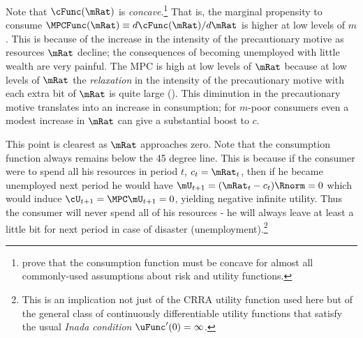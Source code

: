 \documentclass{\handout}
\begin{document}
Note that $\cFunc(\mRat)$ is {\it concave}.\footnote{\cite{carroll&kimball:concavity} prove that the consumption
function must be concave for almost all commonly-used assumptions about
risk and utility functions.} That is, the marginal propensity to
consume $\MPCFunc(\mRat) \equiv d \cFunc(\mRat)/d \mRat$ is higher at low levels of $m$.  This is because
of the increase in the intensity of the precautionary motive as resources
$\mRat$ decline; the consequences of becoming unemployed with little wealth are very painful.  The MPC is high at low
levels of $\mRat$ because at low levels of $\mRat$ the {\it relaxation} in the
intensity of the precautionary motive with each extra bit of $\mRat$ is quite large (\cite{kimball:smallandlarge}).
This diminution in the precautionary motive translates into an increase
in consumption; for $m$-poor consumers even a modest increase in $\mRat$ can
give a substantial boost to $c$.

This point is clearest as $\mRat$ approaches zero.  Note that the
consumption function always remains below the 45 degree line.  This
is because if the consumer were to spend all his resources in
period $t$, $c_{t}=\mRat_{t}$, then if he became unemployed next
period he would have $\mU_{t+1}=(\mRat_{t}-c_{t})\Rnorm=0$ which
would induce $\cU_{t+1}= \MPCU \mU_{t+1}=0$, yielding negative
infinite utility.  Thus the consumer will never spend all of his
resources - he will always leave at least a little bit for next period
in case of disaster (unemployment).\footnote{This is an implication not just
of the CRRA utility function used here but of the general class of continuously differentiable utility
functions that satisfy the usual {\it Inada condition} $\uFunc^{\prime}(0) = \infty$.}
\end{document}
